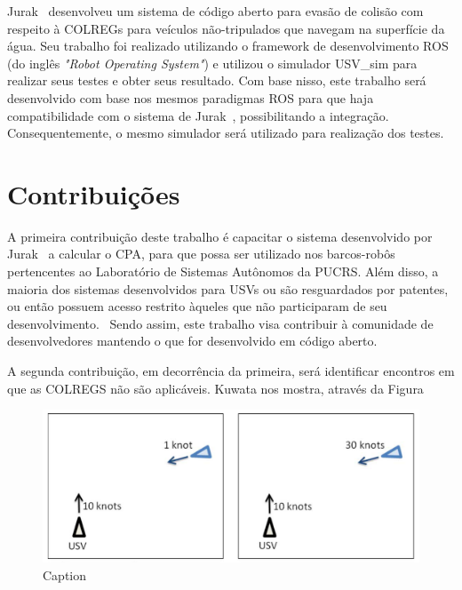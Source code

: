        Jurak~\cite{JURAK2020} desenvolveu um sistema de código aberto para evasão de colisão com respeito à COLREGs para veículos não-tripulados que navegam na superfície da água. Seu trabalho foi realizado utilizando o framework de desenvolvimento ROS (do inglês \textit{"Robot Operating System"}) e utilizou o simulador USV\_sim para realizar seus testes e obter seus resultado. Com base nisso, este trabalho será desenvolvido com base nos mesmos paradigmas ROS para que haja compatibilidade com o sistema de Jurak~\cite{JURAK2020}, possibilitando a integração. Consequentemente, o mesmo simulador será utilizado para realização dos testes.
        
    \section{Contribuições}\label{subchap1:contrib}
        A primeira contribuição deste trabalho é capacitar o sistema desenvolvido por Jurak~\cite{JURAK2020} a calcular o CPA, para que possa ser utilizado nos barcos-robôs pertencentes ao Laboratório de Sistemas Autônomos da PUCRS. Além disso, a maioria dos sistemas desenvolvidos para USVs ou são resguardados por patentes, ou então possuem acesso restrito àqueles que não participaram de seu desenvolvimento.~\cite{JURAK2020} Sendo assim, este trabalho visa contribuir à comunidade de desenvolvedores mantendo o que for desenvolvido em código aberto.
        
        A segunda contribuição, em decorrência da primeira, será identificar encontros em que as COLREGS não são aplicáveis. Kuwata \etal nos mostra, através da Figura
        
        
        
        \begin{figure}
            \centering
            \includegraphics[width=\textwidth]{fig/colregs_situation_not_applied.png}
            \caption{Caption}
            \label{fig:colregs_na}
        \end{figure}